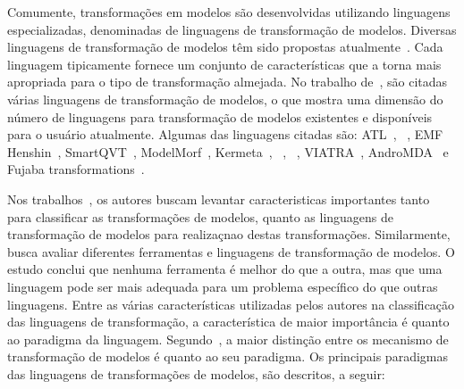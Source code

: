 
Comumente, transformações em modelos são desenvolvidas utilizando linguagens especializadas, denominadas de linguagens de transformação de modelos. Diversas linguagens de transformação de modelos têm sido propostas atualmente~\cite{Allilaire_06, Biehl_2010}. Cada linguagem tipicamente fornece um conjunto de características que a torna mais apropriada para o tipo de transformação almejada. No trabalho de~, são citadas várias linguagens de transformação de modelos, o que mostra uma dimensão do número de linguagens para transformação de modelos existentes e disponíveis para o usuário atualmente. Algumas das linguagens citadas são: ATL~\cite{ATL_eclipse,Jouault_2008}, ~\cite{QVT:OMG}, EMF Henshin~\cite{EMF_Henshin}, SmartQVT~\cite{SmartQVT}, ModelMorf~\cite{ModelMorf}, Kermeta~\cite{kermeta}, ~\cite{ETL_eclipse}, ~\cite{OpenArchitectureWare}, VIATRA~\cite{viatra}, AndroMDA~\cite{andromda} e Fujaba transformations~\cite{fujaba}.

Nos trabalhos~\cite{Biehl_2010, Mens_2006, Allilaire_06}, os autores buscam levantar caracteristicas importantes tanto para classificar as transformações de modelos, quanto as linguagens de transformação de modelos  para realizaçnao destas transformações. Similarmente,~ busca avaliar diferentes ferramentas e linguagens de transformação de modelos. O estudo conclui que nenhuma ferramenta é melhor do que a outra, mas que uma linguagem pode ser mais adequada para um problema específico do que outras linguagens. Entre as várias características utilizadas pelos autores na classificação das linguagens de transformação, a característica de maior importância é quanto ao paradigma da linguagem. Segundo~, a maior distinção entre os mecanismo de transformação de modelos é quanto ao seu paradigma. Os principais paradigmas das linguagens de transformações de modelos, são descritos, a seguir:

